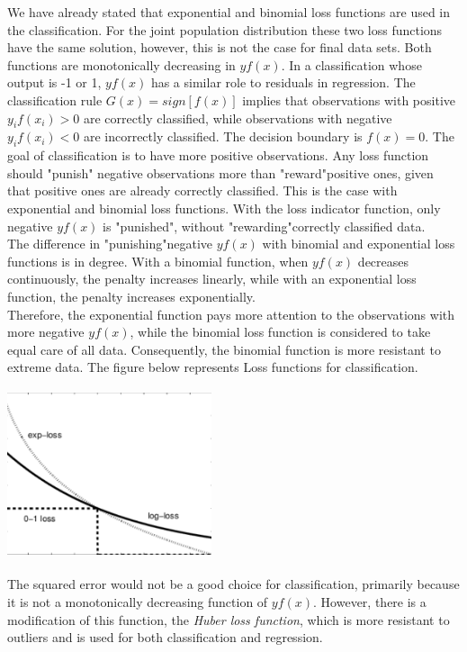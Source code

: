 \documentclass[12pt, letterpaper, twoside]{article}
\begin{document}
\hspace*{4ex} We have already stated that exponential and binomial loss functions are used in the classification. For the joint population distribution these two loss functions have the same solution, however, this is not the case for final data sets. Both functions are monotonically decreasing in $yf(x)$. In a classification whose output is -1 or 1, $yf(x)$ has a similar role to residuals in regression. The classification rule $G(x) = sign[f(x)]$ implies that observations with positive $y_if(x_i) > 0$ are correctly classified, while observations with negative $y_if(x_i) < 0$ are incorrectly classified. The decision boundary is $f(x) = 0$. The goal of classification is to have more positive observations. Any loss function should "punish" \space negative observations more than "reward"\space positive ones, given that positive ones are already correctly classified. This is the case with exponential and binomial loss functions. With the loss indicator function, only negative $yf(x)$ is "punished", without "rewarding"\space correctly classified data.\\
\hspace*{4ex} The difference in "punishing"\space negative $yf(x)$ with binomial and exponential loss functions is in degree. With a binomial function, when $yf(x)$ decreases continuously, the penalty increases linearly, while with an exponential loss function, the penalty increases exponentially.\\
\hspace*{4ex}Therefore, the exponential function pays more attention to the observations with more negative $yf(x)$, while the binomial loss function is considered to take equal care of all data. Consequently, the binomial function is more resistant to extreme data. The figure below represents Loss functions for classification.
\begin{center}
\includegraphics[width=6cm, height=5cm]{loss}
\end{center}
\hspace*{4ex}The squared error would not be a good choice for classification, primarily because it is not a monotonically decreasing function of $yf(x)$. However, there is a modification of this function, the \emph{Huber loss function}, which is more resistant to outliers and is used for both classification and regression.\\
\end{document}

